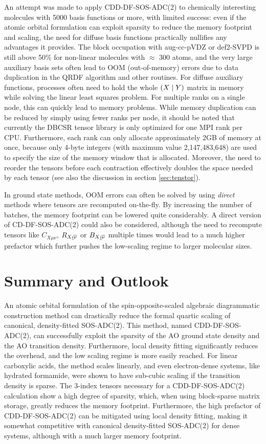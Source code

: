 An attempt was made to apply CDD-DF-SOS-ADC(2) to chemically interesting molecules with 5000 basis functions or more, with limited success: even if the atomic orbital formulation can exploit sparsity to reduce the memory footprint and scaling, the need for diffuse basis functions  practically nullifies any advantages it provides. The block occupation with aug-cc-pVDZ or def2-SVPD is still above 50\% for non-linear molecules with $\approx$ 300 atoms, and the very large auxiliary basis sets often lead to OOM (out-of-memory) errors due to data duplication in the QRDF algorithm and other routines. For diffuse auxiliary functions, processes often need to hold the whole $\left( X \mid Y \right)$ matrix in memory while solving the linear least squares problem. For multiple ranks on a single node, this can quickly lead to memory problems. While memory duplication can be reduced by simply using fewer ranks per node, it should be noted that currently the DBCSR tensor library is only optimized for one MPI rank per CPU. Furthermore, each rank can only allocate approximately 2GB of memory at once, because only 4-byte integers (with maximum value 2,147,483,648) are used to specify the size of the memory window that is allocated. Moreover, the need to reorder the tensors before each contraction effectively doubles the space needed by each tensor (see also the discussion in section \ref{sec:tenstor}).

In ground state methods, OOM errors can often be solved by using \emph{direct} methods where tensors are recomputed on-the-fly. By increasing the number of batches, the memory footprint can be lowered quite considerably. A direct version of CD-DF-SOS-ADC(2) could also be considered, although the need to recompute tensors like $C_{X\mu\nu}$, $R_{X\underline{i}\overline{\nu}}$ or $B_{X\underline{i}\overline{\nu}}$ multiple times would lead to a much higher prefactor which further pushes the low-scaling regime to larger molecular sizes.

\section{Summary and Outlook}

An atomic orbital formulation of the spin-opposite-scaled algebraic diagrammatic construction method can drastically reduce the formal quartic scaling of canonical, density-fitted SOS-ADC(2). This method, named CDD-DF-SOS-ADC(2), can successfully exploit the sparsity of the AO ground state density and the AO transition density. Furthermore, local density fitting significantly reduces the overhead, and the low scaling regime is more easily reached. For linear carboxylic acids, the method scales linearly, and even electron-dense systems, like hydrated formamide, were shown to have sub-cubic scaling if the transition density is sparse. The 3-index tensors necessary for a CDD-DF-SOS-ADC(2) calculation show a high degree of sparsity, which, when using block-sparse matrix storage, greatly reduces the memory footprint. Furthermore, the high prefactor of CDD-DF-SOS-ADC(2) can be mitigated using local density fitting, making it somewhat competitive with canonical density-fitted SOS-ADC(2) for dense systems, although with a much larger memory footprint.

